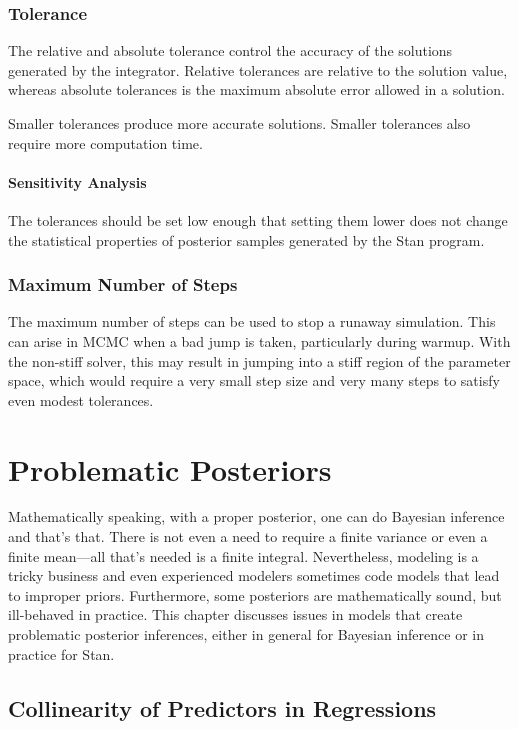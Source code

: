 \subsection{Tolerance}

The relative and absolute tolerance control the accuracy of the
solutions generated by the integrator.  Relative tolerances are
relative to the solution value, whereas absolute tolerances is the
maximum absolute error allowed in a solution.  

Smaller tolerances produce more accurate solutions.  Smaller
tolerances also require more computation time.  

\subsubsection{Sensitivity Analysis}

The tolerances should be set low enough that setting them lower does
not change the statistical properties of posterior samples generated
by the Stan program.

\subsection{Maximum Number of Steps}

The maximum number of steps can be used to stop a runaway simulation.
This can arise in MCMC when a bad jump is taken, particularly during
warmup.  With the non-stiff solver, this may result in jumping into a
stiff region of the parameter space, which would require a very small
step size and very many steps to satisfy even modest tolerances.  


\chapter{Problematic Posteriors}\label{problematic-posteriors.chapter}%
\noindent
Mathematically speaking, with a proper posterior, one can do Bayesian
inference and that's that. There is not even a need to require a
finite variance or even a finite mean---all that's needed is a finite
integral.  Nevertheless, modeling is a tricky business and even
experienced modelers sometimes code models that lead to improper
priors.  Furthermore, some posteriors are mathematically sound, but
ill-behaved in practice.  This chapter discusses issues in models that
create problematic posterior inferences, either in general for
Bayesian inference or in practice for Stan.


\section{Collinearity of Predictors in Regressions}\label{collinearity.section}

